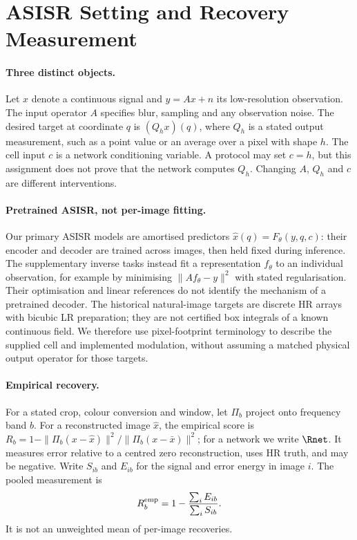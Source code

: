 \section{ASISR Setting and Recovery Measurement}\label{sec:setup}

\paragraph{Three distinct objects.} Let $x$ denote a continuous signal and
$y=Ax+n$ its low-resolution observation. The input operator $A$ specifies
blur, sampling and any observation noise. The desired target at coordinate
$q$ is $(Q_hx)(q)$, where $Q_h$ is a stated output measurement, such as a
point value or an average over a pixel with shape $h$. The cell input $c$
is a network conditioning variable. A protocol may set $c=h$, but this
assignment does not prove that the network computes $Q_h$. Changing $A$,
$Q_h$ and $c$ are different interventions.

\paragraph{Pretrained ASISR, not per-image fitting.} Our primary ASISR
models are amortised predictors $\hat x(q)=F_\theta(y,q,c)$: their encoder
and decoder are trained across images, then held fixed during inference.
The supplementary inverse tasks instead fit a representation $f_\theta$
to an individual observation, for example by minimising
$\|Af_\theta-y\|^2$ with stated regularisation. Their optimisation and
linear references do not identify the mechanism of a pretrained decoder.
The historical natural-image targets are discrete HR arrays with
bicubic LR preparation; they are not certified box integrals of a known
continuous field. We therefore use pixel-footprint terminology to describe
the supplied cell and implemented modulation, without assuming a matched
physical output operator for those targets.

\paragraph{Empirical recovery.} For a stated crop, colour conversion and
window, let $\Pi_b$ project onto frequency band $b$. For a reconstructed
image $\hat x$, the empirical score is
$R_b=1-\|\Pi_b(x-\hat x)\|^2/\|\Pi_b(x-\bar x)\|^2$;
for a network we write $\Rnet$. It measures error relative to a centred
zero reconstruction, uses HR truth, and may be negative. Write $S_{ib}$
and $E_{ib}$ for the signal and error energy in image $i$. The pooled
measurement is
\begin{equation}\label{eq:pooled}
R_b^{\rm emp}=1-\frac{\sum_i E_{ib}}{\sum_i S_{ib}}.
\end{equation}
It is not an unweighted mean of per-image recoveries.

